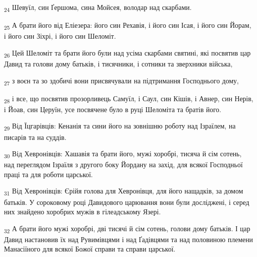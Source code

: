 \begin{tcolorbox}
\textsubscript{24} Шевуїл, син Ґершома, сина Мойсея, володар над скарбами.
\end{tcolorbox}
\begin{tcolorbox}
\textsubscript{25} А брати його від Еліезера: його син Рехавія, і його син Ісая, і його син Йорам, і його син Зіхрі, і його син Шеломіт.
\end{tcolorbox}
\begin{tcolorbox}
\textsubscript{26} Цей Шеломіт та брати його були над усіма скарбами святині, які посвятив цар Давид та голови дому батьків, і тисячники, і сотники та зверхники війська,
\end{tcolorbox}
\begin{tcolorbox}
\textsubscript{27} з воєн та зо здобичі вони присвячували на підтримання Господнього дому,
\end{tcolorbox}
\begin{tcolorbox}
\textsubscript{28} і все, що посвятив прозорливець Самуїл, і Саул, син Кішів, і Авнер, син Нерів, і Йоав, син Церуїн, усе посвячене було в руці Шеломіта та братів його.
\end{tcolorbox}
\begin{tcolorbox}
\textsubscript{29} Від Їцгарівців: Кенанія та сини його на зовнішню роботу над Ізраїлем, на писарів та на суддів.
\end{tcolorbox}
\begin{tcolorbox}
\textsubscript{30} Від Хевронівців: Хашавія та брати його, мужі хоробрі, тисяча й сім сотень, над переглядом Ізраїля з другого боку Йордану на захід, для всякої Господньої праці та для роботи царської.
\end{tcolorbox}
\begin{tcolorbox}
\textsubscript{31} Від Хевронівців: Єрійя голова для Хевронівця, для його нащадків, за домом батьків. У сороковому році Давидового царювання вони були досліджені, і серед них знайдено хоробрих мужів в гілеадському Язері.
\end{tcolorbox}
\begin{tcolorbox}
\textsubscript{32} А брати його мужі хоробрі, дві тисячі й сім сотень, голови дому батьків. І цар Давид настановив їх над Рувимівцями і над Ґадівцями та над половиною племени Манасіїного для всякої Божої справи та справи царської.
\end{tcolorbox}
